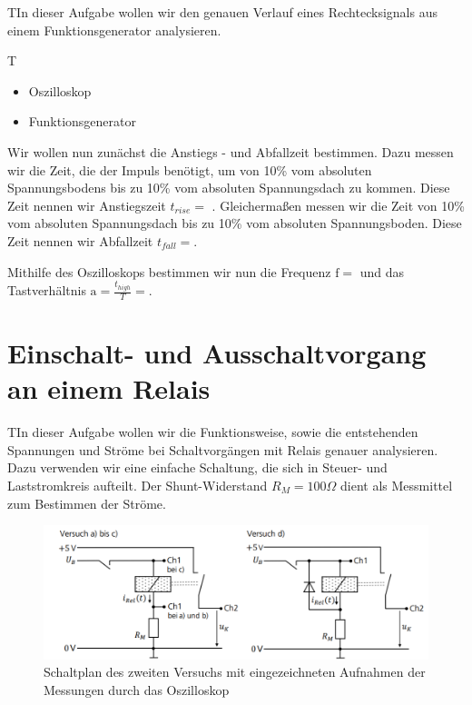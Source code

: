 \documentclass{article}
\begin{document}
\begin{task}
    TIn dieser Aufgabe wollen wir den genauen Verlauf eines Rechtecksignals aus einem Funktionsgenerator analysieren.
\end{task}
\begin{devlist}
    T\begin{itemize}
        \item Oszilloskop
        \item Funktionsgenerator
    \end{itemize}
\end{devlist}
Wir wollen nun zunächst die Anstiegs - und Abfallzeit bestimmen. Dazu messen wir die Zeit, die der Impuls benötigt, um von 10\%
vom absoluten Spannungsbodens bis zu 10\% vom absoluten Spannungsdach zu kommen. Diese Zeit nennen wir Anstiegszeit $t_{rise}= $ . Gleichermaßen
messen wir die Zeit von 10\% vom absoluten Spannungsdach bis zu 10\% vom absoluten Spannungsboden. Diese Zeit nennen wir Abfallzeit $t_{fall} = $.

Mithilfe des Oszilloskops bestimmen wir nun die Frequenz $\mathrm{f} = $ und das Tastverhältnis $\mathrm{a} = \frac{t_{high}}{T} = $.

\newpage


\section{Einschalt- und Ausschaltvorgang an einem Relais}

\begin{task}
    TIn dieser Aufgabe wollen wir die Funktionsweise, sowie die entstehenden Spannungen und Ströme bei Schaltvorgängen mit Relais
    genauer analysieren. Dazu verwenden wir eine einfache Schaltung, die sich in Steuer- und Laststromkreis aufteilt. Der Shunt-Widerstand $R_M = 100\Omega$ dient als Messmittel
    zum Bestimmen der Ströme.
\end{task}
\begin{figure}[h]
    \begin{center}
        \includegraphics[scale=0.8]{../assets/images/ET2P4/Schaltplan2.PNG}
        \caption{Schaltplan des zweiten Versuchs mit eingezeichneten Aufnahmen der Messungen durch das Oszilloskop}
    \end{center}
\end{figure}
\end{document}
